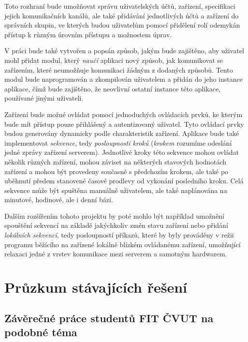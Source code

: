 Toto rozhraní bude umožňovat správu uživatelských účtů, zařízení, specifikaci jejich komunikačních kanálů, ale také přidávání jednotlivých účtů a zařízení do správních skupin, ve kterých budou uživatelům pomocí přidělení rolí odemykán přístup k různým úrovním přístupu a možnostem úprav.

V práci bude také vytvořen a popsán způsob, jakým bude zajištěno, aby uživatel mohl přidat modul, který \emph{naučí} aplikaci nový způsob, jak komunikovat se zařízením, které neumožňuje komunikaci žádným z dodaných způsobů. Tento modul bude naprogramován a zkompilován uživatelem a přidán do jeho instance aplikace, čímž bude zajištěno, že neovlivní ostatní instance této aplikace, používané jinými uživateli.

Zařízení bude možné ovládat pomocí jednoduchých ovládacích prvků, ke kterým bude mít přístup pouze přihlášený a autentizovaný uživatel. Tyto ovládací prvky budou generovány dynamicky podle charakteristik zařízení. Aplikace bude také implementovat \emph{sekvence}, tedy \emph{posloupnosti kroků} (\emph{krokem} rozumíme odeslání jedné zprávy zařízení serverem). Jednotlivé kroky této sekvence mohou ovládat několik různých zařízení, mohou záviset na některých stavových hodnotách zařízení a mohou být provedeny současně s předchozím krokem, ale také po uběhnutí předem stanovené časové prodlevy od vykonání posledního kroku. Celá sekvence může být spuštěna manuálně uživatelem, ale také naplánována na minutové, hodinové, ale i denní bázi. 

Dalším rozšířením tohoto projektu by poté mohlo být například umožnění spouštění sekvencí na základě jakýchkoliv změn stavu zařízení nebo přidání \emph{lokálních sekvencí}, tedy posloupností příkazů, které by byly prováděny v režii programu běžícího na zařízené lokálně blízkém ovládanému zařízení, umožňující relaxaci jedné z vrstev komunikace mezi serverem a samotným hardwarem.

\chapter{Průzkum stávajících řešení}

\section{Závěrečné práce studentů FIT ČVUT na podobné téma}

